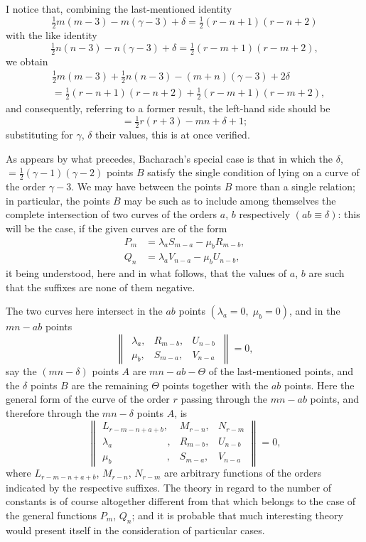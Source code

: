 \documentclass[11pt,a4paper]{book}
\begin{document}
I notice that, combining the last-mentioned identity
\[
\tfrac12 m(m-3) - m(\gamma-3) + \delta = \tfrac12(r-n+1)(r-n+2)
\]
with the like identity
\[
\tfrac12 n(n-3) - n(\gamma-3) + \delta = \tfrac12(r-m+1)(r-m+2),
\]
we obtain
\begin{align*}
&\tfrac12 m(m-3) + \tfrac12 n(n-3) - (m+n)(\gamma-3) + 2\delta\\
&= \tfrac12(r-n+1)(r-n+2) + \tfrac12(r-m+1)(r-m+2),
\end{align*}
and consequently, referring to a former result, the left-hand side should be
\[
= \tfrac12 r(r+3) - mn + \delta + 1;
\]
substituting for $\gamma$, $\delta$ their values, this is at once verified.

As appears by what precedes, Bacharach's special case is that in which the
$\delta$, $= \tfrac12(\gamma-1)(\gamma-2)$ points $B$ satisfy the single condition of lying on a curve of the
order $\gamma-3$. We may have between the points $B$ more than a single relation; in
particular, the points $B$ may be such as to include among themselves the complete
intersection of two curves of the orders $a$, $b$ respectively $(ab \equiv \delta)$: this will be the
case, if the given curves are of the form
\begin{align*}
P_m &= \lambda_a S_{m-a} - \mu_b R_{m-b},\\
Q_n &= \lambda_a V_{n-a} - \mu_b U_{n-b},
\end{align*}
it being understood, here and in what follows, that the values of $a$, $b$ are such that
the suffixes are none of them negative.

The two curves here intersect in the $ab$ points $(\lambda_a = 0,\; \mu_b = 0)$, and in the
$mn - ab$ points
\[
\begin{Vmatrix}
\,\lambda_a, & R_{m-b}, & U_{n-b}\, \\
\,\mu_b, & S_{m-a}, & V_{n-a}\,
\end{Vmatrix}
= 0,
\]
say the $(mn - \delta)$ points $A$ are $mn - ab - \Theta$ of the last-mentioned points, and the $\delta$
points $B$ are the remaining $\Theta$ points together with the $ab$ points. Here the general
form of the curve of the order $r$ passing through the $mn - ab$ points, and therefore
through the $mn - \delta$ points $A$, is
\[
\begin{Vmatrix}
L_{r-m-n+a+b}, & M_{r-n}, & N_{r-m} \\
\lambda_a\phantom{_{r-m-n+a+b}}, & R_{m-b}, & U_{n-b} \\
\mu_b\phantom{_{r-m-n+a+b}}, & S_{m-a}, & V_{n-a}
\end{Vmatrix}
= 0,
\]
where $L_{r-m-n+a+b}$, $M_{r-n}$, $N_{r-m}$ are arbitrary functions of the orders indicated by
the respective suffixes. The theory in regard to the number of constants is of course
altogether different from that which belongs to the case of the general functions
$P_m$, $Q_n$; and it is probable that much interesting theory would present itself in the
consideration of particular cases.
\end{document}
